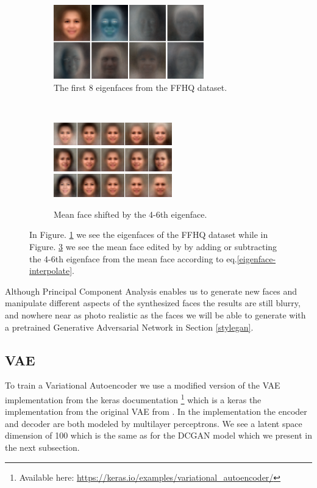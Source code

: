 \begin{figure} [h!]
\centering
    \begin{subfigure}[b]{0.55\textwidth}
    \includegraphics[height=3.2cm]{fig/PCA/pca}
     \caption{The first 8 eigenfaces from the FFHQ dataset.}
    \label{eigenfacehere}
    \end{subfigure}
    ~
    \begin{subfigure}[b]{0.4\textwidth}
        \includegraphics[height=1cm]{fig/PCA/pca3}
        \includegraphics[height=1cm]{fig/PCA/pca4}
         \includegraphics[height=1cm]{fig/PCA/pca5}
         \caption{Mean face shifted by the 4-6th eigenface.}
         \label{components}
    \end{subfigure}
     \caption{ In Figure. \ref{eigenfacehere} we see the eigenfaces of the FFHQ dataset while in Figure. \ref{components} we see the mean face edited by by adding or subtracting the 4-6th eigenface from the mean face according to eq.\ref{eigenface-interpolate}.}
\end{figure}
Although Principal Component Analysis enables us to generate new faces and manipulate different aspects of the synthesized faces the results are still blurry, and nowhere near as photo realistic as the faces we will be able to generate with a pretrained Generative Adversarial Network in Section \ref{stylegan}.

\subsection{VAE}
To train a Variational Autoencoder we use a modified version of the VAE implementation from the keras documentation \footnote{ Available here: \url{https://keras.io/examples/variational_autoencoder/}} which is a keras the implementation from the original VAE from \cite{vae}. In the implementation the encoder and decoder are both modeled by multilayer perceptrons. We see a latent space dimension of 100 which is the same as for the DCGAN model which we present in the next subsection.

